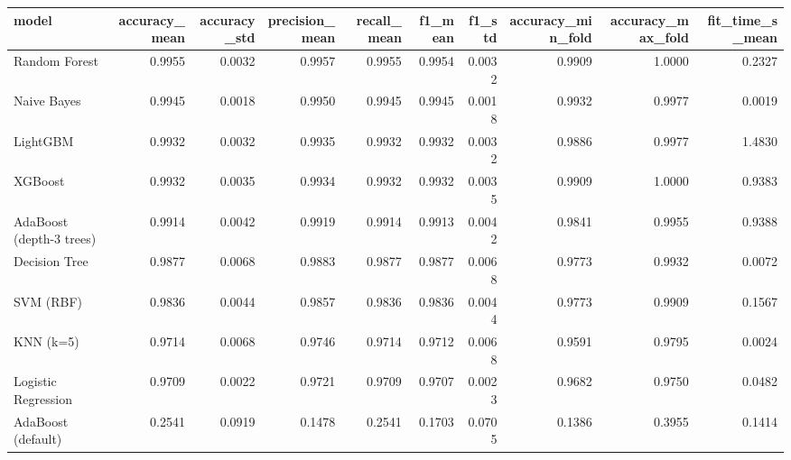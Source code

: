 \begin{tabular}{lrrrrrrrrr}
\toprule
model & accuracy_mean & accuracy_std & precision_mean & recall_mean & f1_mean & f1_std & accuracy_min_fold & accuracy_max_fold & fit_time_s_mean \\
\midrule
Random Forest & 0.9955 & 0.0032 & 0.9957 & 0.9955 & 0.9954 & 0.0032 & 0.9909 & 1.0000 & 0.2327 \\
Naive Bayes & 0.9945 & 0.0018 & 0.9950 & 0.9945 & 0.9945 & 0.0018 & 0.9932 & 0.9977 & 0.0019 \\
LightGBM & 0.9932 & 0.0032 & 0.9935 & 0.9932 & 0.9932 & 0.0032 & 0.9886 & 0.9977 & 1.4830 \\
XGBoost & 0.9932 & 0.0035 & 0.9934 & 0.9932 & 0.9932 & 0.0035 & 0.9909 & 1.0000 & 0.9383 \\
AdaBoost (depth-3 trees) & 0.9914 & 0.0042 & 0.9919 & 0.9914 & 0.9913 & 0.0042 & 0.9841 & 0.9955 & 0.9388 \\
Decision Tree & 0.9877 & 0.0068 & 0.9883 & 0.9877 & 0.9877 & 0.0068 & 0.9773 & 0.9932 & 0.0072 \\
SVM (RBF) & 0.9836 & 0.0044 & 0.9857 & 0.9836 & 0.9836 & 0.0044 & 0.9773 & 0.9909 & 0.1567 \\
KNN (k=5) & 0.9714 & 0.0068 & 0.9746 & 0.9714 & 0.9712 & 0.0068 & 0.9591 & 0.9795 & 0.0024 \\
Logistic Regression & 0.9709 & 0.0022 & 0.9721 & 0.9709 & 0.9707 & 0.0023 & 0.9682 & 0.9750 & 0.0482 \\
AdaBoost (default) & 0.2541 & 0.0919 & 0.1478 & 0.2541 & 0.1703 & 0.0705 & 0.1386 & 0.3955 & 0.1414 \\
\bottomrule
\end{tabular}
